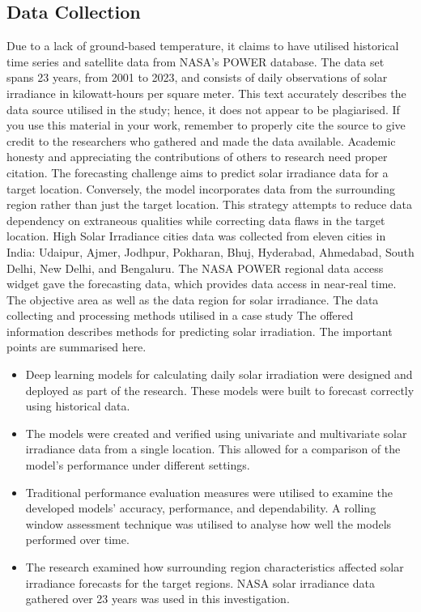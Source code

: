\subsection{Data Collection}
Due to a lack of ground-based temperature, it claims to have utilised historical time series and satellite data from NASA's POWER database. The data set spans 23 years, from 2001 to 2023, and consists of daily observations of solar irradiance in kilowatt-hours per square meter. This text accurately describes the data source utilised in the study; hence, it does not appear to be plagiarised. If you use this material in your work, remember to properly cite the source to give credit to the researchers who gathered and made the data available. Academic honesty and appreciating the contributions of others to research need proper citation. The forecasting challenge aims to predict solar irradiance data for a target location. Conversely, the model incorporates data from the surrounding region rather than just the target location. This strategy attempts to reduce data dependency on extraneous qualities while correcting data flaws in the target location.
High Solar Irradiance cities data was collected from eleven cities in India: Udaipur, Ajmer, Jodhpur, Pokharan, Bhuj, Hyderabad, Ahmedabad, South Delhi, New Delhi, and Bengaluru. The NASA POWER regional data access widget gave the forecasting data, which provides data access in near-real time. The objective area as well as the data region for solar irradiance. The data collecting and processing methods utilised in a case study The offered information describes methods for predicting solar irradiation. The important points are summarised here\cite{brahma2020solar}.

\begin{itemize}
\item
Deep learning models for calculating daily solar irradiation were designed and deployed as part of the research. These models were built to forecast correctly using historical data.
\item
The models were created and verified using univariate and multivariate solar irradiance data from a single location. This allowed for a comparison of the model's performance under different settings.

\item
Traditional performance evaluation measures were utilised to examine the developed models' accuracy, performance, and dependability. A rolling window assessment technique was utilised to analyse how well the models performed over time.
\item
The research examined how surrounding region characteristics affected solar irradiance forecasts for the target regions. NASA solar irradiance data gathered over 23 years was used in this investigation.

\end{itemize}

